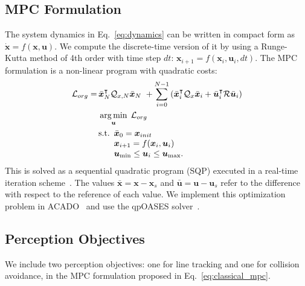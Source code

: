 \subsection{MPC Formulation}\label{ch2_mpc}
%
The system dynamics in Eq.~\ref{eq:dynamics} can be written in compact form as $\dot{\bm{x}} = f(\bm{x}, \bm{u})$. We compute the discrete-time version of it by using a Runge-Kutta method of 4th order with time step $dt$: $\bm{x}_{i+1} = f(\bm{x}_i, \bm{u}_i, dt)$. The MPC formulation is a non-linear program with quadratic costs:
%
\begin{equation}
	\begin{aligned}
		\mathcal{L}_{org} =\, &\bar{\bm{x}}_N^\intercal \mathcal{Q}_{x,N} \bar{\bm{x}}_N ~+ \sum_{i=0}^{N-1} \left(\bar{\bm{x}}_i^\intercal \mathcal{Q}_{x} \bar{\bm{x}}_i + \bar{\bm{u}}_i^\intercal \mathcal{R} \bar{\bm{u}}_i\right) \\
		& \operatorname*{arg\,min}_{\bm{u}} \; \mathcal{L}_{org} \\
		& \text{s.t.} 
		\begin{array}[t]{l}
			\bar{\bm{x}}_0 = \bm{x}_{init}\\
			\bm{x}_{i+1} = f(\bm{x}_i, \bm{u}_i)\\
        \bm{u}_{\textrm{min}} \leq  \bm{u}_i\leq\bm{u}_{\textrm{max}}.
		\end{array}
	\end{aligned}\label{eq:classical_mpc}
\end{equation}
%
This is solved as a sequential quadratic program (SQP) executed in a real-time iteration scheme~\cite{diehl2006fast}. The values $\bar{\bm{x}} = \bm{x} - \bm{x}_s$ and $\bar{\bm{u}} = \bm{u} - \bm{u}_s$ refer to the difference with respect to the reference of each value. We implement this optimization problem in ACADO~\cite{houska2011acado} and use the qpOASES solver~\cite{ferreau2014qpoases}.


\subsection{Perception Objectives}\label{ch2_perception}
We include two perception objectives: one for line tracking and one for collision avoidance, in the MPC formulation proposed in Eq.~\ref{eq:classical_mpc}.

